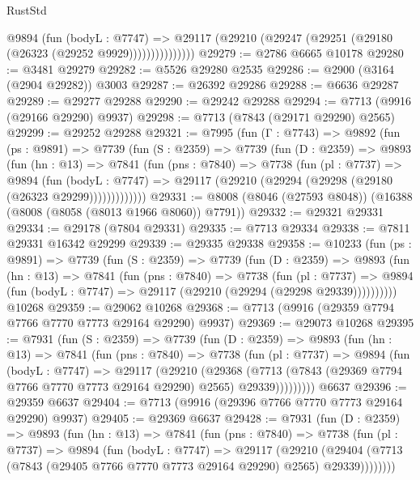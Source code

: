 \begin{lexlean}{RustStd}
\begin{coremodule}
                  @9894
                    (fun (bodyL : @7747) =>
                    @29117 (@29210 (@29247 (@29251 (@29180 (@26323 (@29252 @9929)))))))))))))))
@29279 := @2786 @6665 @10178
@29280 := @3481 @29279
@29282 := @5526 @29280 @2535
@29286 := @2900 (@3164 (@2904 @29282)) @3003
@29287 := @26392 @29286
@29288 := @6636 @29287
@29289 := @29277 @29288
@29290 := @29242 @29288
@29294 := @7713 (@9916 (@29166 @29290) @9937)
@29298 := @7713 (@7843 (@29171 @29290) @2565)
@29299 := @29252 @29288
@29321 := @7995
    (fun (Γ : @7743) =>
    @9892
      (fun (ps : @9891) =>
      @7739
        (fun (S : @2359) =>
        @7739
          (fun (D : @2359) =>
          @9893
            (fun (hn : @13) =>
            @7841
              (fun (pns : @7840) =>
              @7738
                (fun (pl : @7737) =>
                @9894
                  (fun (bodyL : @7747) =>
                  @29117 (@29210 (@29294 (@29298 (@29180 (@26323 @29299)))))))))))))
@29331 := @8008 (@8046 (@27593 @8048)) (@16388 (@8008 (@8058 (@8013 @1966 @8060)) @7791))
@29332 := @29321 @29331
@29334 := @29178 (@7804 @29331)
@29335 := @7713 @29334
@29338 := @7811 @29331 @16342 @29299
@29339 := @29335 @29338
@29358 := @10233
    (fun (ps : @9891) =>
    @7739
      (fun (S : @2359) =>
      @7739
        (fun (D : @2359) =>
        @9893
          (fun (hn : @13) =>
          @7841
            (fun (pns : @7840) =>
            @7738
              (fun (pl : @7737) =>
              @9894 (fun (bodyL : @7747) => @29117 (@29210 (@29294 (@29298 @29339))))))))))
    @10268
@29359 := @29062 @10268
@29368 := @7713 (@9916 (@29359 @7794 @7766 @7770 @7773 @29164 @29290) @9937)
@29369 := @29073 @10268
@29395 := @7931
    (fun (S : @2359) =>
    @7739
      (fun (D : @2359) =>
      @9893
        (fun (hn : @13) =>
        @7841
          (fun (pns : @7840) =>
          @7738
            (fun (pl : @7737) =>
            @9894
              (fun (bodyL : @7747) =>
              @29117
                (@29210
                  (@29368
                    (@7713
                      (@7843 (@29369 @7794 @7766 @7770 @7773 @29164 @29290) @2565)
                      @29339)))))))))
    @6637
@29396 := @29359 @6637
@29404 := @7713 (@9916 (@29396 @7766 @7770 @7773 @29164 @29290) @9937)
@29405 := @29369 @6637
@29428 := @7931
    (fun (D : @2359) =>
    @9893
      (fun (hn : @13) =>
      @7841
        (fun (pns : @7840) =>
        @7738
          (fun (pl : @7737) =>
          @9894
            (fun (bodyL : @7747) =>
            @29117
              (@29210
                (@29404 (@7713 (@7843 (@29405 @7766 @7770 @7773 @29164 @29290) @2565) @29339))))))))

\end{coremodule}
\end{lexlean}

